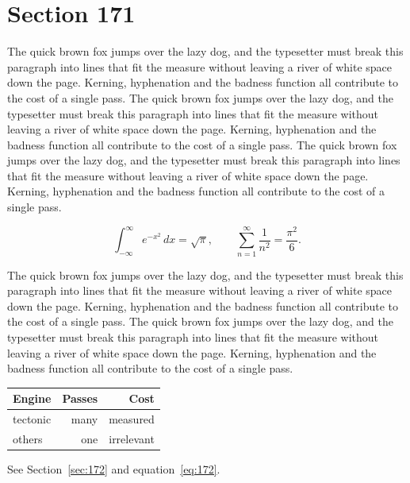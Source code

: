\documentclass{article}
\begin{document}
\section{Section 171}
\label{sec:171}
The quick brown fox jumps over the lazy dog, and the typesetter must break this paragraph into lines that fit the measure without leaving a river of white space down the page. Kerning, hyphenation and the badness function all contribute to the cost of a single pass. The quick brown fox jumps over the lazy dog, and the typesetter must break this paragraph into lines that fit the measure without leaving a river of white space down the page. Kerning, hyphenation and the badness function all contribute to the cost of a single pass. The quick brown fox jumps over the lazy dog, and the typesetter must break this paragraph into lines that fit the measure without leaving a river of white space down the page. Kerning, hyphenation and the badness function all contribute to the cost of a single pass. 

\begin{equation}\label{eq:171}
\int_{-\infty}^{\infty} e^{-x^{2}}\,dx = \sqrt{\pi}, \qquad
\sum_{n=1}^{\infty} \frac{1}{n^{2}} = \frac{\pi^{2}}{6}.
\end{equation}

The quick brown fox jumps over the lazy dog, and the typesetter must break this paragraph into lines that fit the measure without leaving a river of white space down the page. Kerning, hyphenation and the badness function all contribute to the cost of a single pass. The quick brown fox jumps over the lazy dog, and the typesetter must break this paragraph into lines that fit the measure without leaving a river of white space down the page. Kerning, hyphenation and the badness function all contribute to the cost of a single pass. 

\begin{center}
\begin{tabular}{lrr}
\toprule
Engine & Passes & Cost \\
\midrule
tectonic & many & measured \\
others & one & irrelevant \\
\bottomrule
\end{tabular}
\end{center}

See Section~\ref{sec:172} and equation~\eqref{eq:172}.
\end{document}
